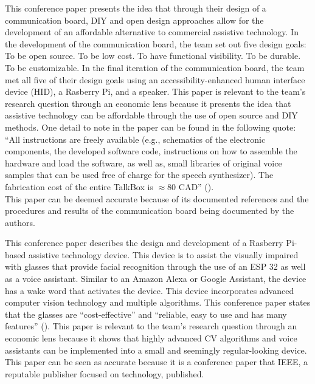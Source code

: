         
\pagebreak


          This conference paper presents the idea that through their design of a communication board, DIY and open design approaches allow for the development of an affordable alternative to commercial assistive technology.
          In the development of the communication board, the team set out five design goals:
          To be open source.
          To be low cost.
          To have functional visibility.
          To be durable.
          To be customizable.
          In the final iteration of the communication board, the team met all five of their design goals using an accessibility-enhanced human interface device (HID), a Rasberry Pi, and a speaker. 
          This paper is relevant to the team's research question through an economic lens because it presents the idea that assistive technology can be affordable through the use of open source and DIY methods.
          One detail to note in the paper can be found in the following quote: ``All
          instructions are freely available (e.g., schematics of the electronic components,
          the developed software code, instructions on how to assemble the hardware and
          load the software, as well as, small libraries of original voice samples that can be
          used free of charge for the speech synthesizer). The fabrication cost of the entire
          TalkBox is $\approx$80 CAD'' (\cite{10.1007/978-3-319-08599-9_44}). \\ 
          This paper can be deemed accurate because of its documented references and the procedures and results of the communication board being documented by the authors.
          

\pagebreak
{}

This conference paper describes the design and development of a Rasberry Pi-based assistive technology device. This device is to assist the visually impaired with glasses that provide facial recognition through the use of an ESP 32
          as well as a voice assistant. Similar to an Amazon Alexa or Google Assistant, the device has a wake word that activates the device. This device incorporates advanced computer vision technology and multiple algorithms. This conference paper states that the glasses are ``cost-effective'' and  ``reliable, easy to use and has many features'' (\cite{9768012}).
          This paper is relevant to the team's research question through an economic lens because it shows that highly advanced CV algorithms and voice assistants can be implemented into a small and seemingly regular-looking device. 
          \\This paper can be seen as accurate because it is a conference paper that IEEE, a reputable publisher focused on technology, published.







